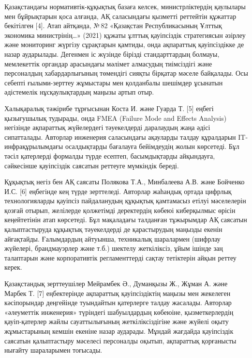\begin{multicols}{2}
Қазақстандағы нормативтік-құқықтық базаға келсек, министрліктердің
қаулылары мен бұйрықтарын қоса алғанда, АҚ саласындағы қызметті
реттейтін құжаттар бекітілген {[}4{]}. Атап айтқанда, №\,82 «Қазақстан
Республикасының Ұлттық экономика министрінің\ldots» (2021) құжаты ұлттық
қауіпсіздік стратегиясын әзірлеу және мониторинг жүргізу сұрақтарын
қамтиды, онда ақпараттық қауіпсіздікке де назар аударылады. Дегенмен іс
жүзінде бірізді стандарттардың болмауы, мемлекеттік органдар арасындағы
мәлімет алмасудың тиімсіздігі және персоналдың хабардарлығының төмендігі
сияқты бірқатар мәселе байқалады. Осы себепті ғылыми-зерттеу жұмыстары
мен қолданбалы шешімдер ұсынатын әдістемелік нұсқаулықтардың маңызы
артып отыр.

Халықаралық тәжірибе тұрғысынан Коста И. және Гуарда Т. {[}5{]} еңбегі
қызығушылық тудырады, онда FMEA (Failure Mode and Effects Analysis)
негізінде ақпараттық жүйелердегі тәуекелдерді даралаудың жаңа әдісі
сипатталады. Авторлар инженерия саласындағы ақауларды талдау құралдарын
IT-инфрақұрылымдағы осалдықтарды бағалауға бейімдеудің жолын көрсетеді.
Бұл тәсіл қатерлерді формалды түрде есептеп, басымдықтарды айқындауға,
сәйкесінше қауіпсіздік саясатын реттеуге мүмкіндік береді.

Құқықтық негіз бен АҚ саясаты Полякова Т.А., Минбалеева А.В. және
Бойченко И.С. {[}6{]} еңбегінде кең түрде зерттеледі. Авторлар жаһандық
ортада цифрлық технологияларды қауіпсіз пайдаланудың құқықтық қамтамасыз
етілуі мәселелерін қозғай отырып, желілерде қолжетімді деректердің
көбеюі киберқылмыс өрісін кеңейтетінін атап көрсетеді. Бұл мақаладағы
талданған тұжырымдар АҚ саясатын қалыптастыруда құқықтық тәуекелдерді де
қарастырудың маңызды екенін айғақтайды. Ғалымдардың айтуынша, техникалық
шаралармен (шифрлау жүйелері, брандмауэрлер және т.б.) шектелу
жеткіліксіз, ұйым ішінде заң талаптарын және корпоративтік
регламенттерді сақтау тетіктерін айқын реттеу керек.

Қазақстандық зерттеушілер Мейрамбек Ә., Думанқызы Ж., Жұман А. және
Марбек Т. {[}7{]} еңбектерінде ақпараттық қауіпсіздіктің маңызы мен
жекелеген кәсіпорындар деңгейінде туындайтын қатерлерге талдау жасалады.
Авторлар «әлеуметтік инженерия» түріндегі шабуылдардың көбеюіне,
қызметкерлердің қауіп-қатерлер жайлы сауаттылығының жеткіліксіздігіне
және жүйелі оқыту жұмыстарының кемшін екеніне назар аударады. Мұндай
жағдайда қауіпсіздік саясатын қалыптастыру мәселесі персоналды оқытып,
ақпараттық қорғанысты нығайту шараларымен тоғысады.


\end{multicols}
